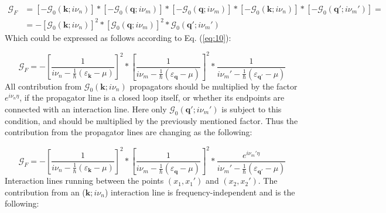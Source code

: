 \begin{align} \label{eq:11}
\mathcal{G}_{F}
&=
\left[ - \mathcal{G}_{0} \left( \boldsymbol{k}; i \nu_{n} \right) \right]
*
\left[ - \mathcal{G}_{0} \left( \boldsymbol{q}; i \nu_{m} \right) \right]
*
\left[ - \mathcal{G}_{0} \left( \boldsymbol{q}; i \nu_{m} \right) \right]
*
\left[ - \mathcal{G}_{0} \left( \boldsymbol{k}; i \nu_{n} \right) \right]
*
\left[ - \mathcal{G}_{0} \left( \boldsymbol{q}'; i \nu_{m}' \right) \right]
= \nonumber \\
&=
- \left[ \mathcal{G}_{0} \left( \boldsymbol{k}; i \nu_{n} \right) \right]^{2}
*
\left[ \mathcal{G}_{0} \left( \boldsymbol{q}; i \nu_{m} \right) \right]^{2}
*
\mathcal{G}_{0} \left( \boldsymbol{q}'; i \nu_{m}' \right)
\end{align}
Which could be expressed as follows according to Eq. (\ref{eq:10}):

\begin{equation} \label{eq:12}
\mathcal{G}_{F}
=
- \left[
\frac{1}{i \nu_{n} - \frac{1}{\hbar} \left( \varepsilon_{\boldsymbol{k}} - \mu \right)}
\right]^{2}
*
\left[
\frac{1}{i \nu_{m} - \frac{1}{\hbar} \left( \varepsilon_{\boldsymbol{q}} - \mu \right)}
\right]^{2}
*
\frac{1}{i \nu_{m}' - \frac{1}{\hbar} \left( \varepsilon_{\boldsymbol{q}'} - \mu \right)}
\end{equation}
All contribution from $\mathcal{G}_{0} \left( \boldsymbol{k}; i \nu_{n} \right)$ propagators should be multiplied by the factor $e^{i \nu_{n} \eta}$, if the propagator line is a closed loop itself, or whether its endpoints are connected with an interaction line. Here only $\mathcal{G}_{0} \left( \boldsymbol{q}'; i \nu_{m}' \right)$ is subject to this condition, and should be multiplied by the previously mentioned factor. Thus the contribution from the propagator lines are changing as the following:

\begin{equation} \label{eq:13}
\mathcal{G}_{F}
=
- \left[
\frac{1}{i \nu_{n} - \frac{1}{\hbar} \left( \varepsilon_{\boldsymbol{k}} - \mu \right)}
\right]^{2}
*
\left[
\frac{1}{i \nu_{m} - \frac{1}{\hbar} \left( \varepsilon_{\boldsymbol{q}} - \mu \right)}
\right]^{2}
*
\frac{e^{i \nu_{m}' \eta}}{i \nu_{m}' - \frac{1}{\hbar} \left( \varepsilon_{\boldsymbol{q}'} - \mu \right)}
\end{equation}
Interaction lines running between the points $\left( x_{1}, x_{1}' \right)$ and $\left( x_{2}, x_{2}' \right)$. The contribution from an ($\boldsymbol{k}; i \nu_{n}$) interaction line is frequency-independent and is the following:

